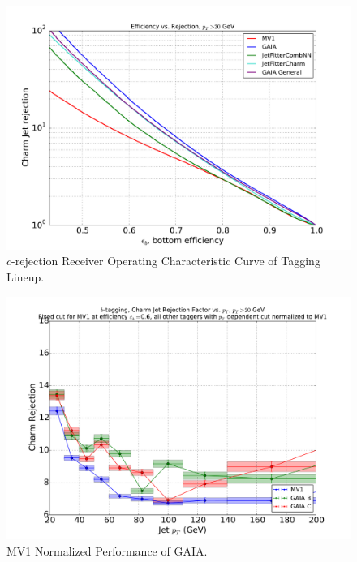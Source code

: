 \begin{figure}
\includegraphics[width=\textwidth]{figures/btag/c_rej_ROC.pdf}
\caption[The ATLAS detector]{$c$-rejection Receiver Operating Characteristic Curve of Tagging Lineup.
\label{fig:crejROC}}
\end{figure}

\begin{figure}
\includegraphics[width=\textwidth]{figures/btag/c_rej_mv1normalized_pTdep_60pct.pdf}
\caption[The ATLAS detector]{MV1 Normalized Performance of GAIA.
\label{fig:crejmv1norm60}}
\end{figure}

